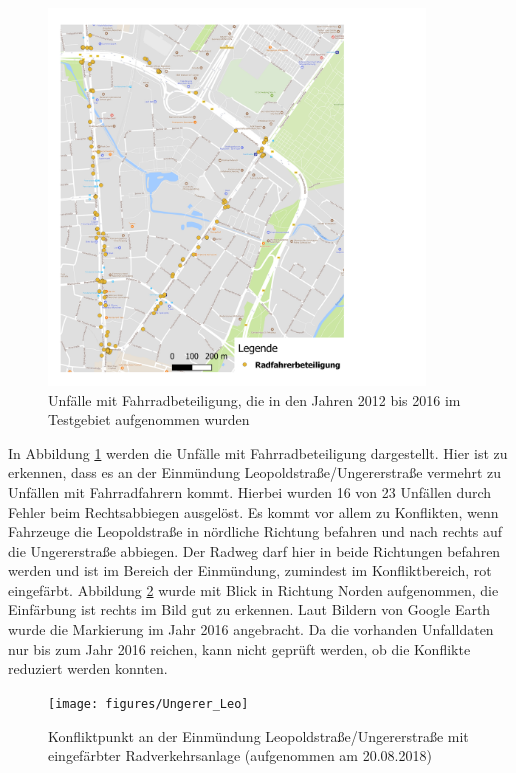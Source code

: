 \begin{savenotes}
	\begin{figure}[H]
		\centering
		\includegraphics[width=10cm,height=10cm]{figures/map_radfahrer}
		\caption[Unfälle mit Fahrradbeteiligung, die in den Jahren 2012 bis 2016 im Testgebiet aufgenommen wurden]{Unfälle mit Fahrradbeteiligung, die in den Jahren 2012 bis 2016 im Testgebiet aufgenommen wurden}\label{fig:map_radfahrer}
	\end{figure}
\end{savenotes}

In Abbildung \ref{fig:map_radfahrer} werden die Unfälle mit Fahrradbeteiligung dargestellt. Hier ist zu erkennen, dass es an der Einmündung Leopoldstraße/Ungererstraße vermehrt zu Unfällen mit Fahrradfahrern kommt. Hierbei wurden 16 von 23 Unfällen durch Fehler beim Rechtsabbiegen ausgelöst. Es kommt vor allem zu Konflikten, wenn Fahrzeuge die Leopoldstraße in nördliche Richtung befahren und nach rechts auf die Ungererstraße abbiegen. Der Radweg darf hier in beide Richtungen befahren werden und ist im Bereich der Einmündung, zumindest im Konfliktbereich, rot eingefärbt. Abbildung \ref{fig:Konflikt_Ungerer_Leo} wurde mit Blick in Richtung Norden aufgenommen, die Einfärbung ist rechts im Bild gut zu erkennen. Laut Bildern von Google Earth wurde die Markierung im Jahr 2016 angebracht. Da die vorhanden Unfalldaten nur bis zum Jahr 2016 reichen, kann nicht geprüft werden, ob die Konflikte reduziert werden konnten.

\begin{savenotes}
	\begin{figure}[H]
		\centering
		\texttt{[image: figures/Ungerer\_Leo]}
		\caption[Konfliktpunkt an der Einmündung Leopoldstraße/Ungererstraße mit eingefärbter Radverkehrsanlage]{Konfliktpunkt an der Einmündung Leopoldstraße/Ungererstraße mit eingefärbter Radverkehrsanlage (aufgenommen am 20.08.2018)}\label{fig:Konflikt_Ungerer_Leo}
	\end{figure}
\end{savenotes}

